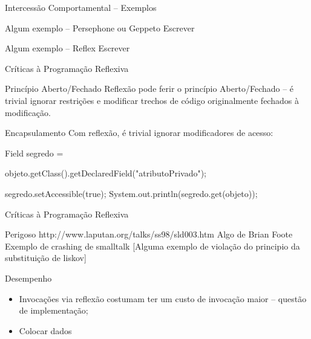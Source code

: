 \documentclass[12pt,t]{beamer}
\begin{document}
 	 \begin{frame}{Intercessão Comportamental -- Exemplos}
 	 	\begin{exampleblock}{Algum exemplo -- Persephone ou Geppeto}
 	 		\alert{Escrever}
 	 	\end{exampleblock}
 	 	\begin{exampleblock}{Algum exemplo -- Reflex}
 	 		\alert{Escrever}
 	 	\end{exampleblock}
 	 \end{frame} 	 
 	 \begin{frame}{Críticas à Programação Reflexiva}
 	 	\begin{block}{Princípio Aberto/Fechado}
 	 		Reflexão pode ferir o princípio Aberto/Fechado \cite{meyer1988object} -- é trivial ignorar restrições e modificar trechos de código originalmente fechados à modificação.
 	 	\end{block}
 	 	\begin{block}{Encapsulamento}
 	 		Com reflexão, é trivial ignorar modificadores de acesso:
 	 		\begin{adjustwidth}{2.5em}{0pt}
 	 			Field segredo = \\
 	 			\begin{adjustwidth}{2.5em}{0pt}
 	 				objeto.getClass().getDeclaredField("atributoPrivado");
 	 			\end{adjustwidth}
				segredo.setAccessible(true);
				System.out.println(segredo.get(objeto));
			\end{adjustwidth}
 	 	\end{block}
 	 \end{frame}
 	 \begin{frame}{Críticas à Programação Reflexiva}
 	 	\begin{block}{Perigoso}
 	 		http://www.laputan.org/talks/ss98/sld003.htm
 	 		\alert{Algo de Brian Foote}
 	 		\alert{Exemplo de crashing de smalltalk}
 	 		\alert{[Alguma exemplo de violação do principio da substituição de liskov]}
 	 	\end{block}
 	 	\begin{block}{Desempenho}
 	 		\begin{itemize}
 	 			\item Invocações via reflexão costumam ter um custo de invocação maior -- \alert{questão de implementação};
 	 			\item \alert{Colocar dados}
 	 		\end{itemize}
 	 	\end{block}
 	 \end{frame}
\end{document}
